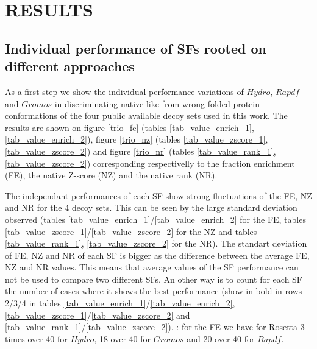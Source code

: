 \documentclass[a4paper,20pt,notitlepage,openbib]{article}
\begin{document}
\section{RESULTS}

\subsection{Individual performance of SFs rooted on different approaches}
As a first step we show the individual performance variations of $Hydro$, $Rapdf$ and $Gromos$ in discriminating native-like from wrong folded protein conformations of the four public available decoy sets used in this work. The results are shown on figure \ref{trio_fe} (tables \ref{tab_value_enrich_1}, \ref{tab_value_enrich_2}), figure \ref{trio_nz} (tables \ref{tab_value_zscore_1}, \ref{tab_value_zscore_2}) and figure \ref{trio_nr} (tables \ref{tab_value_rank_1}, \ref{tab_value_zscore_2}) corresponding respectivelly to the fraction enrichment (FE), the native Z-score (NZ) and the native rank (NR).

The independant performances of each SF show strong fluctuations of the FE, NZ and NR for the 4 decoy sets. This can be seen by the large standard deviation observed (tables \ref{tab_value_enrich_1}/\ref{tab_value_enrich_2} for the FE, tables \ref{tab_value_zscore_1}/\ref{tab_value_zscore_2} for the NZ and tables \ref{tab_value_rank_1}, \ref{tab_value_zscore_2} for the NR). The standart deviation of FE, NZ and NR of each SF is bigger as the difference between the average FE, NZ and NR values. This means that average values of the SF performance can not be used to compare two different SFs. An other way is to count for each SF the number of cases where it shows the best performance (show in bold in rows 2/3/4 in tables  \ref{tab_value_enrich_1}/\ref{tab_value_enrich_2}, \ref{tab_value_zscore_1}/\ref{tab_value_zscore_2} and \ref{tab_value_rank_1}/\ref{tab_value_zscore_2}). : for the FE we have for Rosetta 3 times over 40 for $Hydro$, 18 over 40 for $Gromos$ and 20 over 40 for $Rapdf$.
\end{document}
